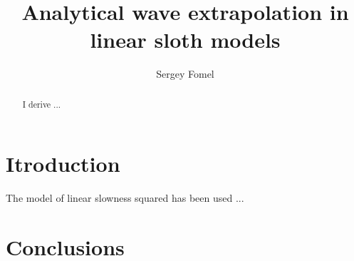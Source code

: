 \title{Analytical wave extrapolation in linear sloth models}
\author{Sergey Fomel}

\maketitle

\begin{abstract}
  I derive ...
\end{abstract}

\section{Itroduction}

The model of linear slowness squared has been used ...


\section{Conclusions}






